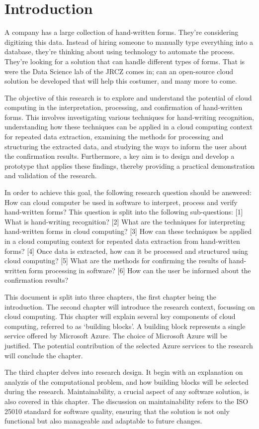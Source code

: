 \section{Introduction}

A company has a large collection of hand-written forms.
They’re considering digitizing this data.
Instead of hiring someone to manually type everything into a database,
they’re thinking about using technology to automate the process.
They’re looking for a solution that can handle different types of forms.
That is were the Data Science lab of the JRCZ comes in;
can an open-source cloud solution be developed that will help this costumer, and many more to come.

The objective of this research is to explore and understand the potential of cloud computing in the interpretation,
processing, and confirmation of hand-written forms.
This involves investigating various techniques for hand-writing recognition,
understanding how these techniques can be applied in a cloud computing context for repeated data extraction,
examining the methods for processing and structuring the extracted data,
and studying the ways to inform the user about the confirmation results.
Furthermore, a key aim is to design and develop a prototype that applies these findings,
thereby providing a practical demonstration and validation of the research.

In order to achieve this goal, the following research question should be answered:
How can cloud computer be used in software to interpret, process and verify hand-written forms?
This question is split into the following sub-questions:
[1] What is hand-writing recognition?
[2] What are the techniques for interpreting hand-written forms in cloud computing?
[3] How can these techniques be applied in a cloud computing context for repeated data extraction from hand-written forms?
[4] Once data is extracted, how can it be processed and structured using cloud computing?
[5] What are the methods for confirming the results of hand-written form processing in software?
[6] How can the user be informed about the confirmation results?

This document is split into three chapters, the first chapter being the introduction.
The second chapter will introduce the research context, focussing on cloud computing.
This chapter will explain several key components of cloud computing, referred to as `building blocks'.
A building block represents a single service offered by Microsoft Azure.
The choice of Microsoft Azure will be justified.
The potential contribution of the selected Azure services to the research will conclude the chapter.

The third chapter delves into research design.
It begin with an explanation on analyzis of the computational problem,
and how building blocks will be selected during the research.
Maintainability, a crucial aspect of any software solution, is also covered in this chapter.
The discussion on maintainability refers to the ISO 25010 standard for software quality,
ensuring that the solution is not only functional but also manageable and adaptable to future changes.